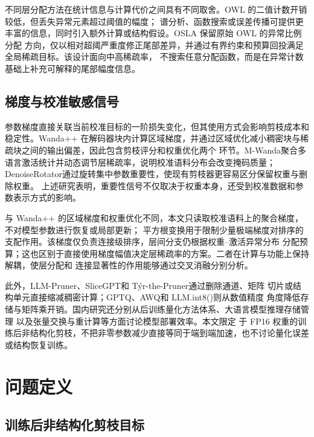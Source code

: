 \documentclass[UTF8,fontset=fandol]{ctexart}
\begin{document}
不同层分配方法在统计信息与计算代价之间具有不同取舍。OWL 的二值计数开销较低，但丢失异常元素超过阈值的幅度；
谱分析、函数搜索或误差传播可提供更丰富的信息，同时引入额外计算或结构假设。OSLA 保留原始 OWL 的异常比例分配
方向，仅以相对超阈严重度修正尾部差异，并通过有界约束和预算回投满足全局稀疏目标。该设计面向中高稀疏率，
不搜索任意分配函数，而是在异常计数基础上补充可解释的尾部幅度信息。

\subsection{梯度与校准敏感信号}

参数梯度直接关联当前校准目标的一阶损失变化，但其使用方式会影响剪枝成本和稳定性。Wanda++\cite{wandaplusplus}
在解码器块内计算区域梯度，并通过区域优化减小稠密块与稀疏块之间的输出偏差，因此包含剪枝评分和权重优化两个
环节。M-Wanda\cite{mwanda}聚合多语言激活统计并动态调节层稀疏率，说明校准语料分布会改变掩码质量；
DenoiseRotator\cite{denoiserotator}通过旋转集中参数重要性，使现有剪枝器更容易区分保留权重与删除权重。
上述研究表明，重要性信号不仅取决于权重本身，还受到校准数据和参数表示方式的影响。

与 Wanda++ 的区域梯度和权重优化不同，本文只读取校准语料上的聚合梯度，不对模型参数进行恢复或局部更新；
平方根变换用于限制少量极端梯度对排序的支配作用。该梯度仅负责连接级排序，层间分支仍根据权重--激活异常分布
分配预算；这也区别于直接使用梯度幅值决定层稀疏率的方案\cite{pals}。二者在计算与功能上保持解耦，使层分配和
连接显著性的作用能够通过交叉消融分别分析。

此外，LLM-Pruner\cite{llmpruner}、SliceGPT\cite{slicegpt}和 T\'yr-the-Pruner\cite{tyr}通过删除通道、矩阵
切片或结构单元直接缩减稠密计算；GPTQ\cite{gptq}、AWQ\cite{awq}和 LLM.int8()\cite{llmint8}则从数值精度
角度降低存储与矩阵乘开销。国内研究还分别从后训练量化方法体系\cite{zhang2026ptq}、大语言模型推理存储管理
\cite{ge2025storage}以及张量交换与重计算\cite{liang2025adaptive}等方面讨论模型部署效率。本文限定
于 FP16 权重的训练后非结构化剪枝，不把非零参数减少直接等同于端到端加速，也不讨论量化误差或结构恢复训练。

\section{问题定义}

\subsection{训练后非结构化剪枝目标}
\end{document}
